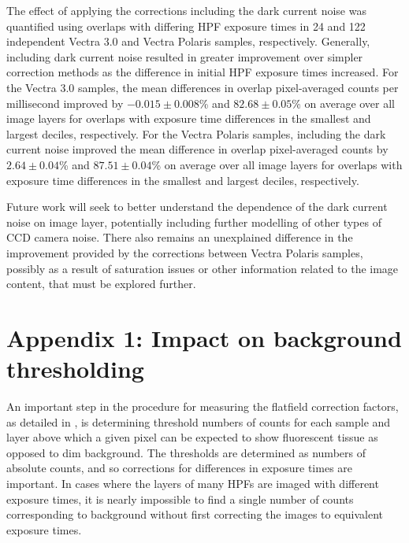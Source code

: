 \documentclass[letterpaper,11pt]{article}
\begin{document}
The effect of applying the corrections including the dark current noise was quantified using overlaps with differing HPF exposure times in 24 and 122 independent Vectra 3.0 and Vectra Polaris samples, respectively. Generally, including dark current noise resulted in greater improvement over simpler correction methods as the difference in initial HPF exposure times increased. For the Vectra 3.0 samples, the mean differences in overlap pixel-averaged counts per millisecond improved by $-0.015\pm0.008$\% and $82.68\pm0.05$\% on average over all image layers for overlaps with exposure time differences in the smallest and largest deciles, respectively. For the Vectra Polaris samples, including the dark current noise improved the mean difference in overlap pixel-averaged counts by $2.64\pm0.04$\% and $87.51\pm0.04$\% on average over all image layers for overlaps with exposure time differences in the smallest and largest deciles, respectively.

Future work will seek to better understand the dependence of the dark current noise on image layer, potentially including further modelling of other types of CCD camera noise. There also remains an unexplained difference in the improvement provided by the corrections between Vectra Polaris samples, possibly as a result of saturation issues or other information related to the image content, that must be explored further.

\clearpage


\clearpage
\appendix

\section{Appendix 1: Impact on background thresholding}
\label{sec:impact_on_background_threshold}

An important step in the procedure for measuring the flatfield correction factors, as detailed in \cite{flatfielding_note}, is determining threshold numbers of counts for each sample and layer above which a given pixel can be expected to show fluorescent tissue as opposed to dim background. The thresholds are determined as numbers of absolute counts, and so corrections for differences in exposure times are important. In cases where the layers of many HPFs are imaged with different exposure times, it is nearly impossible to find a single number of counts corresponding to background without first correcting the images to equivalent exposure times.
\end{document}
